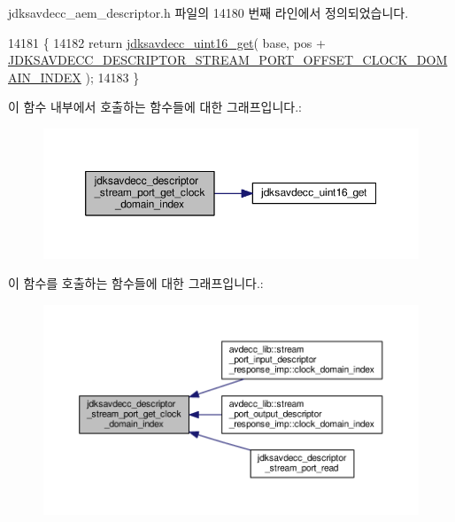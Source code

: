 jdksavdecc\+\_\+aem\+\_\+descriptor.\+h 파일의 14180 번째 라인에서 정의되었습니다.


\begin{DoxyCode}
14181 \{
14182     \textcolor{keywordflow}{return} \hyperlink{group__endian_ga3fbbbc20be954aa61e039872965b0dc9}{jdksavdecc\_uint16\_get}( base, pos + 
      \hyperlink{group__descriptor__stream__port_gab743c1465e9b47def43f997cc261735c}{JDKSAVDECC\_DESCRIPTOR\_STREAM\_PORT\_OFFSET\_CLOCK\_DOMAIN\_INDEX}
       );
14183 \}
\end{DoxyCode}


이 함수 내부에서 호출하는 함수들에 대한 그래프입니다.\+:
\nopagebreak
\begin{figure}[H]
\begin{center}
\leavevmode
\includegraphics[width=350pt]{group__descriptor__stream__port_gaaf86a219e03309d42d2037bc17edd4bf_cgraph}
\end{center}
\end{figure}




이 함수를 호출하는 함수들에 대한 그래프입니다.\+:
\nopagebreak
\begin{figure}[H]
\begin{center}
\leavevmode
\includegraphics[width=350pt]{group__descriptor__stream__port_gaaf86a219e03309d42d2037bc17edd4bf_icgraph}
\end{center}
\end{figure}


